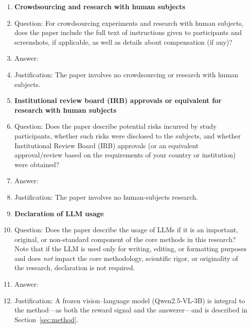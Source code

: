 \begin{enumerate}
\item {\bf Crowdsourcing and research with human subjects}
    \item[] Question: For crowdsourcing experiments and research with human subjects, does the paper include the full text of instructions given to participants and screenshots, if applicable, as well as details about compensation (if any)?
    \item[] Answer: \answerNA{}
    \item[] Justification: The paper involves no crowdsourcing or research with human subjects.

\item {\bf Institutional review board (IRB) approvals or equivalent for research with human subjects}
    \item[] Question: Does the paper describe potential risks incurred by study participants, whether such risks were disclosed to the subjects, and whether Institutional Review Board (IRB) approvals (or an equivalent approval/review based on the requirements of your country or institution) were obtained?
    \item[] Answer: \answerNA{}
    \item[] Justification: The paper involves no human-subjects research.

\item {\bf Declaration of LLM usage}
    \item[] Question: Does the paper describe the usage of LLMs if it is an important, original, or non-standard component of the core methods in this research? Note that if the LLM is used only for writing, editing, or formatting purposes and does \emph{not} impact the core methodology, scientific rigor, or originality of the research, declaration is not required.
    \item[] Answer: \answerYes{}
    \item[] Justification: A frozen vision--language model (Qwen2.5-VL-3B) is integral to the method---as both the reward signal and the answerer---and is described in Section~\ref{sec:method}.

\end{enumerate}
